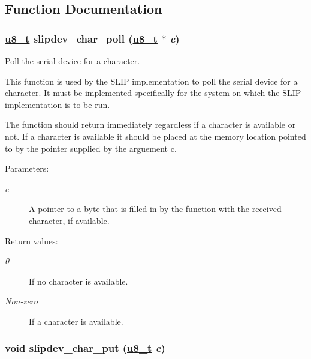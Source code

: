 \subsection{Function Documentation}
\hypertarget{a00068_g4e8cf1d2e3d874b7aa681a272d957ccb}{
\subsubsection[slipdev\_\-char\_\-poll]{\setlength{\rightskip}{0pt plus 5cm}\hyperlink{a00070_ge081489b4906f65a3cb18e9fbe9f8d23}{u8\_\-t} slipdev\_\-char\_\-poll (\hyperlink{a00070_ge081489b4906f65a3cb18e9fbe9f8d23}{u8\_\-t} $\ast$ {\em c})}}
\label{a00068_g4e8cf1d2e3d874b7aa681a272d957ccb}


Poll the serial device for a character. 

This function is used by the SLIP implementation to poll the serial device for a character. It must be implemented specifically for the system on which the SLIP implementation is to be run.

The function should return immediately regardless if a character is available or not. If a character is available it should be placed at the memory location pointed to by the pointer supplied by the arguement c.

\begin{Desc}
\item[Parameters:]
\begin{description}
\item[{\em c}]A pointer to a byte that is filled in by the function with the received character, if available.\end{description}
\end{Desc}
\begin{Desc}
\item[Return values:]
\begin{description}
\item[{\em 0}]If no character is available. \item[{\em Non-zero}]If a character is available. \end{description}
\end{Desc}
\hypertarget{a00068_gd78a209e9faa8a97702424b44134ced3}{
\subsubsection[slipdev\_\-char\_\-put]{\setlength{\rightskip}{0pt plus 5cm}void slipdev\_\-char\_\-put (\hyperlink{a00070_ge081489b4906f65a3cb18e9fbe9f8d23}{u8\_\-t} {\em c})}}
\label{a00068_gd78a209e9faa8a97702424b44134ced3}


